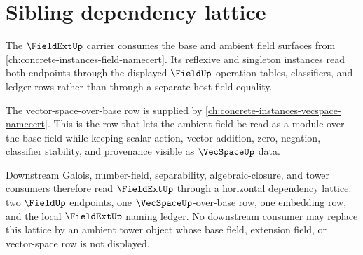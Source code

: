 \section{Sibling dependency lattice}
\label{sec:fieldext-sibling-dependency-lattice}

The $\FieldExtUp$ carrier consumes the base and ambient field surfaces from
\autoref{ch:concrete-instances-field-namecert}. Its reflexive and singleton
instances read both endpoints through the displayed $\FieldUp$ operation
tables, classifiers, and ledger rows rather than through a separate host-field
equality.

The vector-space-over-base row is supplied by
\autoref{ch:concrete-instances-vecspace-namecert}. This is the row that lets
the ambient field be read as a module over the base field while keeping scalar
action, vector addition, zero, negation, classifier stability, and provenance
visible as $\VecSpaceUp$ data.

Downstream Galois, number-field, separability, algebraic-closure, and tower
consumers therefore read $\FieldExtUp$ through a horizontal dependency lattice:
two $\FieldUp$ endpoints, one $\VecSpaceUp$-over-base row, one embedding row,
and the local $\FieldExtUp$ naming ledger. No downstream consumer may replace
this lattice by an ambient tower object whose base field, extension field, or
vector-space row is not displayed.

